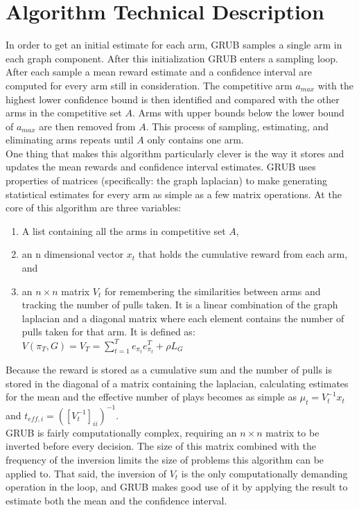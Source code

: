 \documentclass{article}[12pt]
\begin{document}
\pagebreak

\section{Algorithm Technical Description}

In order to get an initial estimate for each arm, GRUB samples a single arm in each graph component.
After this initialization GRUB enters a sampling loop.
After each sample a mean reward estimate and a confidence interval are computed for every arm still in consideration.
The competitive arm $a_{max}$ with the highest lower confidence bound is then identified and compared with the other arms in the competitive set $A$.
Arms with upper bounds below the lower bound of $a_{max}$ are then removed from $A$.
This process of sampling, estimating, and eliminating arms repeats until $A$ only contains one arm. \\


One thing that makes this algorithm particularly clever is the way it stores and updates the mean rewards and confidence interval estimates.
GRUB uses properties of matrices (specifically: the graph laplacian) to make generating statistical estimates for every arm as simple as a few matrix operations.
At the core of this algorithm are three variables:
\begin{enumerate}
    \item A list containing all the arms in competitive set $A$,
    \item an n dimensional vector $x_t$ that holds the cumulative reward from each arm, and
    \item an $n \times n$ matrix $V_t$ for remembering the similarities between arms and tracking the number of pulls taken.
    It is a linear combination of the graph laplacian and a diagonal matrix where each element contains the number of pulls taken for that arm.
        It is defined as: $ V(\pi_T, G) = V_T = \sum_{t=1}^T e_{\pi_t} e_{\pi_t}^T + \rho L_G $
 		
\end{enumerate}

Because the reward is stored as a cumulative sum and the number of pulls is stored in the diagonal of a matrix containing the laplacian,
calculating estimates for the mean and the effective number of plays becomes as simple as $\mu_t = V_t^{-1} x_t$ and $t_{eff,i} = \left( \left[ V_t^{-1} \right]_{ii} \right)^{-1}$. \\

GRUB is fairly computationally complex, requiring an $n \times n$ matrix to be inverted before every decision.
The size of this matrix combined with the frequency of the inversion limits the size of problems this algorithm can be applied to.
That said, the inversion of $V_t$ is the only computationally demanding operation in the loop,
and GRUB makes good use of it by applying the result to estimate both the mean and the confidence interval. \\
\end{document}
